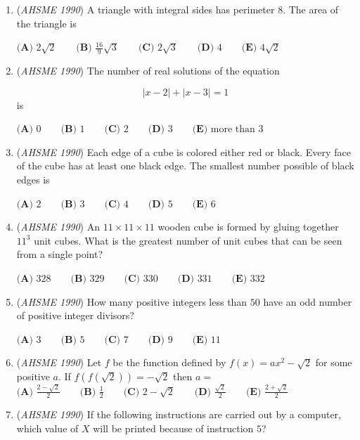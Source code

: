 \begin{enumerate}
 $\textbf{(A) } 0\qquad \textbf{(B) } 1\qquad \textbf{(C) } 2\qquad \textbf{(D) } 3\qquad \textbf{(E) }\text{more than }3$


	\item (\textit{AHSME 1990}) A triangle with integral sides has perimeter $8$. The area of the triangle is


 $\textbf{(A) } 2\sqrt{2}\qquad \textbf{(B) } \frac{16}{9}\sqrt{3}\qquad \textbf{(C) } 2\sqrt{3} \qquad \textbf{(D) } 4\qquad \textbf{(E) } 4\sqrt{2}$


	\item (\textit{AHSME 1990}) The number of real solutions of the equation

 \[|x-2|+|x-3|=1\]
is


 $\textbf{(A) } 0\qquad \textbf{(B) } 1\qquad \textbf{(C) } 2\qquad \textbf{(D) } 3\qquad \textbf{(E) } \text{more than } 3$


	\item (\textit{AHSME 1990}) Each edge of a cube is colored either red or black. Every face of the cube has at least one black edge. The smallest number possible of black edges is


 $\textbf{(A) } 2\qquad \textbf{(B) } 3\qquad \textbf{(C) } 4\qquad \textbf{(D) } 5\qquad \textbf{(E) } 6$


	\item (\textit{AHSME 1990}) An $11\times 11\times 11$ wooden cube is formed by gluing together $11^3$ unit cubes. What is the greatest number of unit cubes that can be seen from a single point?


 $\textbf{(A) }  328\qquad \textbf{(B) }  329\qquad \textbf{(C) }  330\qquad \textbf{(D) }  331\qquad \textbf{(E) }  332$


	\item (\textit{AHSME 1990}) How many positive integers less than $50$ have an odd number of positive integer divisors?


 $\textbf{(A) } 3\qquad \textbf{(B) } 5\qquad \textbf{(C) } 7\qquad \textbf{(D) } 9\qquad \textbf{(E) } 11$


	\item (\textit{AHSME 1990}) Let $f$ be the function defined by $f(x)=ax^2-\sqrt{2}$ for some positive $a$. If $f(f(\sqrt{2}))=-\sqrt{2}$ then $a=$
$\textbf{(A) } \frac{2-\sqrt{2}}{2}\qquad \textbf{(B) } \frac{1}{2}\qquad \textbf{(C) } 2-\sqrt{2}\qquad \textbf{(D) } \frac{\sqrt{2}}{2}\qquad \textbf{(E) } \frac{2+\sqrt{2}}{2}$


	\item (\textit{AHSME 1990}) If the following instructions are carried out by a computer, which value of $X$ will be printed because of instruction $5$?



\end{enumerate}

